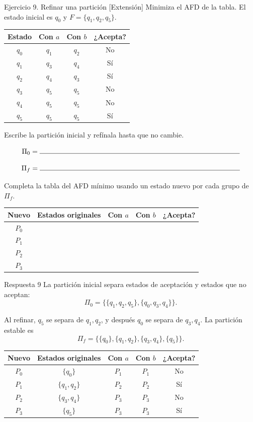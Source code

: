 \documentclass[11pt,spanish]{article}
\newcommand{\blank}[1][4cm]{\rule{#1}{0.4pt}}
\newcommand{\espaciosalida}{0.10cm}
\newcommand{\espaciosalida}{0.60cm}
\begin{document}
\begin{ejercicio}{Ejercicio 9. Refinar una partición \hfill {\small [Extensión]}}
Minimiza el AFD de la tabla. El estado inicial es \(q_0\) y \(F=\{q_1,q_2,q_5\}\).

\begin{center}
\small
\renewcommand{\arraystretch}{1.2}
\begin{tabular}{|c|c|c|c|}
\hline
\textbf{Estado} & \textbf{Con \(a\)} & \textbf{Con \(b\)} & \textbf{¿Acepta?} \tabularnewline
\hline
\(q_0\) & \(q_1\) & \(q_2\) & No \tabularnewline
\hline
\(q_1\) & \(q_3\) & \(q_4\) & Sí \tabularnewline
\hline
\(q_2\) & \(q_4\) & \(q_3\) & Sí \tabularnewline
\hline
\(q_3\) & \(q_5\) & \(q_5\) & No \tabularnewline
\hline
\(q_4\) & \(q_5\) & \(q_5\) & No \tabularnewline
\hline
\(q_5\) & \(q_5\) & \(q_5\) & Sí \tabularnewline
\hline
\end{tabular}
\end{center}

Escribe la partición inicial y refínala hasta que no cambie.

\[
\Pi_0=\blank[10cm]
\]

\[
\Pi_f=\blank[10cm]
\]

Completa la tabla del AFD mínimo usando un estado nuevo por cada grupo de \(\Pi_f\).

\begin{center}
\small
\renewcommand{\arraystretch}{1.25}
\begin{tabular}{|c|c|c|c|c|}
\hline
\textbf{Nuevo} & \textbf{Estados originales} & \textbf{Con \(a\)} & \textbf{Con \(b\)} & \textbf{¿Acepta?} \tabularnewline
\hline
\(P_0\) & & & & \tabularnewline[\espaciosalida]
\hline
\(P_1\) & & & & \tabularnewline[\espaciosalida]
\hline
\(P_2\) & & & & \tabularnewline[\espaciosalida]
\hline
\(P_3\) & & & & \tabularnewline[\espaciosalida]
\hline
\end{tabular}
\end{center}
\end{ejercicio}

\ifrespuestas
\begin{respuesta}{Respuesta 9}
La partición inicial separa estados de aceptación y estados que no aceptan:
\[
\Pi_0=\big\{\{q_1,q_2,q_5\},\{q_0,q_3,q_4\}\big\}.
\]

Al refinar, \(q_5\) se separa de \(q_1,q_2\), y después \(q_0\) se separa de \(q_3,q_4\). La partición estable es
\[
\Pi_f=\big\{\{q_0\},\{q_1,q_2\},\{q_3,q_4\},\{q_5\}\big\}.
\]

\begin{center}
\small
\begin{tabular}{|c|c|c|c|c|}
\hline
\textbf{Nuevo} & \textbf{Estados originales} & \textbf{Con \(a\)} & \textbf{Con \(b\)} & \textbf{¿Acepta?} \tabularnewline
\hline
\(P_0\) & \(\{q_0\}\) & \(P_1\) & \(P_1\) & No \tabularnewline
\hline
\(P_1\) & \(\{q_1,q_2\}\) & \(P_2\) & \(P_2\) & Sí \tabularnewline
\hline
\(P_2\) & \(\{q_3,q_4\}\) & \(P_3\) & \(P_3\) & No \tabularnewline
\hline
\(P_3\) & \(\{q_5\}\) & \(P_3\) & \(P_3\) & Sí \tabularnewline
\hline
\end{tabular}
\end{center}
\end{respuesta}
\fi
\end{document}
